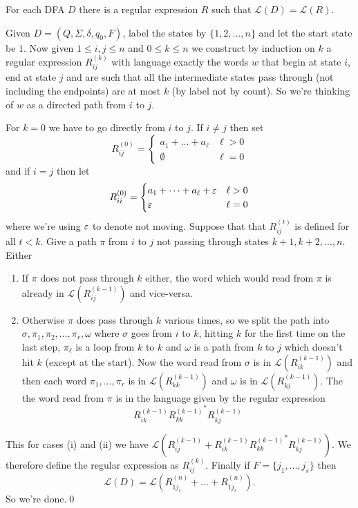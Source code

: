 \documentclass[tikx, border = 10pt]{article}
\begin{document}
\begin{theorem}
  For each DFA $ D $ there is a regular expression $ R $ such that $ \mathcal L(D) = \mathcal L(R) $.
\end{theorem}
\pf Given $ D = (Q,\Sigma, \delta, q_0, F) $, label the states by $ \{1, 2,\dots, n\} $ and let the start state be $ 1 $. Now given $ 1\le i,j\le n $ and $ 0\le k\le n $ we construct by induction on $ k $ a regular expression $ R_{ij}^{(k)} $ with language exactly the words $ w $ that begin at state $ i $, end at state $ j $ and are such that all the intermediate states pass through (not including the endpoints) are at most $ k $ (by label not by count). So we're thinking of $ w $ as a directed path from $ i $ to $ j $.\par
For $ k = 0 $ we have to go directly from $ i $ to $ j $. If $ i\ne j $ then set
\[
	R^{(0)}_{ij} = \begin{cases}
		a_1 + \dots + a_\ell & \ell > 0 \\
		\emptyset &\ell = 0
	\end{cases}
\]
and if $ i=j $ then let
\[
	R^{(0)}_{ii} = \begin{cases}
		a_1 + \dots + a_\ell + \varepsilon & \ell > 0 \\
		\varepsilon & \ell = 0
	\end{cases}
\]
where we're using $ \varepsilon $ to denote not moving. Suppose that that $ R^{(t)}_{ij} $ is defined for all $ t<k $. Give a path $ \pi $ from $ i $ to $ j $ not passing through states $ k+1, k+2, \dots, n $. Either
\begin{enumerate}
	\item If $ \pi $ does not pass through $ k $ either, the word which would read from $ \pi $ is already in $ \mathcal L(R^{(k-1)}_{ij}) $ and vice-versa.
	\item Otherwise $ \pi $ does pass through $ k $ various times, so we split the path into $ \sigma, \pi_1,\pi_2, \dots, \pi_r, \omega $ where $ \sigma $ goes from $ i $ to $ k $, hitting $ k $ for the first time on the last step, $ \pi_\ell $ is a loop from $ k $ to $ k $ and $ \omega $ is a path from $ k $ to $ j $ which doesn't hit $ k $ (except at the start). Now the word read from $ \sigma $ is in $ \mathcal L(R_{ik}^{(k-1)}) $ and then each word $ \pi_1,\dots, \pi_r $ is in $ \mathcal L(R_{kk}^{(k-1)}) $ and $ \omega $ is in $ \mathcal L(R^{(k-1)}_{kj}) $. The the word read from $ \pi $ is in the language given by the regular expression
		\[
			R^{(k-1)}_{ik} {R^{(k-1)}_{kk}}^* R^{(k-1)}_{kj}
		\]
\end{enumerate}
This for cases (i) and (ii) we have $ \mathcal L(R^{(k-1)}_{ij} +	R^{(k-1)}_{ik}{ R^{(k-1)}_{kk}}^* R^{(k-1)}_{kj}) $. We therefore define the regular expression as $ R^{(k)}_{ij} $. Finally if $ F = \{ j_1,\dots, j_s\} $ then
\[
	\mathcal L(D) = \mathcal L(R^{(n)}_{1j_1} + \dots + R^{(n)}_{1j_s}).
\]
So we're done.\qed
\end{document}
